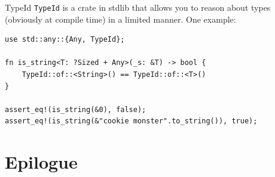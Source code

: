 \documentclass{beamer}
\begin{document}
\begin{frame}[fragile]{TypeId}
  \texttt{TypeId} is a crate in stdlib that allows you to reason about types (obviously at compile time) in a limited manner. One example:
  \begin{verbatim}
use std::any::{Any, TypeId};

fn is_string<T: ?Sized + Any>(_s: &T) -> bool {
    TypeId::of::<String>() == TypeId::of::<T>()
}

assert_eq!(is_string(&0), false);
assert_eq!(is_string(&"cookie monster".to_string()), true);
\end{verbatim}
\end{frame}






\section{Epilogue}
\end{document}
